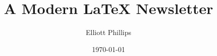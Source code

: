\documentclass[]{fore}
\title[\TeX{} Newsletter]{A Modern \LaTeX{} Newsletter}
\author{Elliott Phillips}
\institute{Office for National Statistics}
\date{\today}
\begin{document}
	
%

\loadpages%
\end{document}
